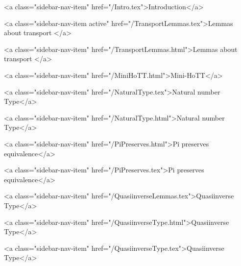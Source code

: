       
    
      
        
          <a class="sidebar-nav-item" href="/Intro.tex">Introduction</a>
        
      
    
      
        
          <a class="sidebar-nav-item active" href="/TransportLemmas.tex">Lemmas about transport </a>
        
      
    
      
        
          <a class="sidebar-nav-item" href="/TransportLemmas.html">Lemmas about transport </a>
        
      
    
      
        
          <a class="sidebar-nav-item" href="/MiniHoTT.html">Mini-HoTT</a>
        
      
    
      
        
          <a class="sidebar-nav-item" href="/NaturalType.tex">Natural number Type</a>
        
      
    
      
        
          <a class="sidebar-nav-item" href="/NaturalType.html">Natural number Type</a>
        
      
    
      
        
          <a class="sidebar-nav-item" href="/PiPreserves.html">Pi preserves equivalence</a>
        
      
    
      
        
          <a class="sidebar-nav-item" href="/PiPreserves.tex">Pi preserves equivalence</a>
        
      
    
      
        
          <a class="sidebar-nav-item" href="/QuasiinverseLemmas.tex">Quasiinverse Type</a>
        
      
    
      
        
          <a class="sidebar-nav-item" href="/QuasiinverseType.html">Quasiinverse Type</a>
        
      
    
      
        
          <a class="sidebar-nav-item" href="/QuasiinverseType.tex">Quasiinverse Type</a>
        
